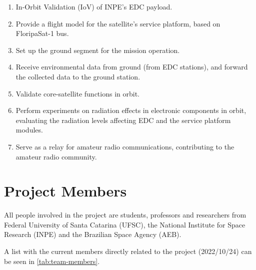 \begin{enumerate}
    \item In-Orbit Validation (IoV) of INPE's EDC payload.
    \item Provide a flight model for the satellite's service platform, based on FloripaSat-1 bus.
    \item Set up the ground segment for the mission operation.
    \item Receive environmental data from ground (from EDC stations), and forward the collected data to the ground station.
    \item Validate core-satellite functions in orbit.
    \item Perform experiments on radiation effects in electronic components in orbit, evaluating the radiation levels affecting EDC and the service platform modules.
    \item Serve as a relay for amateur radio communications, contributing to the amateur radio community.
\end{enumerate}

\section{Project Members}

All people involved in the project are students, professors and researchers from Federal University of Santa Catarina (UFSC), the National Institute for Space Research (INPE) and the Brazilian Space Agency (AEB).

A list with the current members directly related to the project (2022/10/24) can be seen in \autoref{tab:team-members}.

